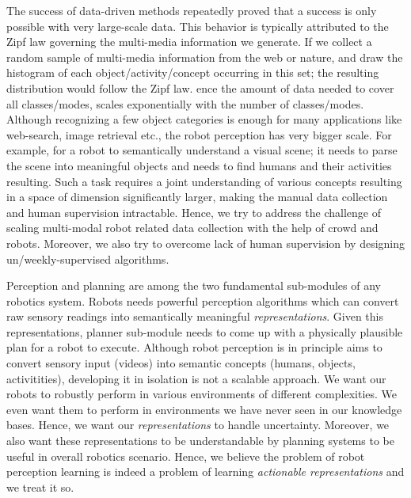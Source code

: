 The success of data-driven methods repeatedly proved that a success is only possible with very large-scale data. This behavior is typically attributed to the Zipf law governing the multi-media information we generate. If we collect a random sample of multi-media information from the web or nature, and draw the histogram of each object/activity/concept occurring in this set; the resulting distribution would follow the Zipf law.  ence the amount of data needed to cover all classes/modes, scales exponentially with the number of classes/modes. Although recognizing a few object categories is enough for many applications like web-search, image retrieval etc., the robot perception has very bigger scale. For example, for a robot to semantically understand a visual scene; it needs to parse the scene into meaningful objects and needs to find humans and their activities resulting. Such a task requires a joint understanding of various concepts resulting in a space of dimension significantly larger, making the manual data collection and human supervision intractable. Hence, we try to address the challenge of scaling multi-modal robot related data collection with the help of crowd and robots. Moreover, we also try to overcome lack of human supervision by designing un/weekly-supervised algorithms.

Perception and planning are among the two fundamental sub-modules of any robotics system. Robots needs powerful perception algorithms which can convert raw sensory readings into semantically meaningful \emph{representations}. Given this representations, planner sub-module needs to come up with a physically plausible plan for a robot to execute. Although robot perception is in principle aims to convert sensory input (\eg videos) into semantic concepts (\eg humans, objects, activitities), developing it in isolation is not a scalable approach. We want our robots to robustly perform in various environments of different complexities. We even want them to perform in environments we have never seen in our knowledge bases. Hence, we want our \emph{representations} to handle uncertainty. Moreover, we also want these representations to be understandable by planning systems to be useful in overall robotics scenario. Hence, we believe the problem of robot perception learning is indeed a problem of learning \emph{actionable representations} and we treat it so.

